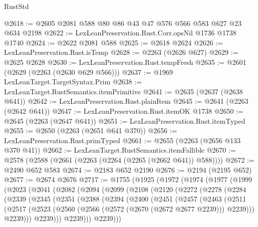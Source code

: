 \begin{lexlean}{RustStd}
\begin{coremodule}
@2618 := @2605 @2081 @588 @80 @86 @43 @47 @576 @566 @583 @627 @23 @634 @2198
@2622 := LexLeanPreservation.Rust.Corr.opsNil @1736 @1738 @1740
@2624 := @2622 @2081 @588
@2625 := @2618 @2624
@2626 := LexLeanPreservation.Rust.isTemp
@2628 := @2263 (@2626 @627)
@2629 := @2625 @2628
@2630 := LexLeanPreservation.Rust.tempFresh
@2635 := @2601 (@2629 (@2263 (@2630 @629 @566)))
@2637 := @1969 LexLeanTarget.TargetSyntax.Prim
@2638 := LexLeanTarget.RustSemantics.itemPrimitive
@2641 := @2635 (@2637 (@2638 @641))
@2642 := LexLeanPreservation.Rust.plainItem
@2645 := @2641 (@2263 (@2642 @641))
@2647 := LexLeanPreservation.Rust.itemOK @1738
@2650 := @2645 (@2263 (@2647 @641))
@2651 := LexLeanPreservation.Rust.itemTyped
@2655 := @2650 (@2263 (@2651 @641 @370))
@2656 := LexLeanPreservation.Rust.primTyped
@2661 := @2655 (@2263 (@2656 @133 @370 @41))
@2662 := LexLeanTarget.RustSemantics.itemFallible
@2670 := @2578 (@2588 (@2661 (@2263 (@2264 (@2265 (@2662 @641)) @588))))
@2672 := @2490 @652 @583
@2674 := @2183 @652 @2190
@2676 := @2194 (@2195 @652)
@2677 := @2674 @2676
@2717 := @1755
    (@1925
      (@1972
        (@1974
          (@1977
            (@1999
              (@2023
                (@2041
                  (@2082
                    (@2094
                      (@2099
                        (@2108
                          (@2120
                            (@2272
                              (@2278
                                (@2284
                                  (@2339
                                    (@2345
                                      (@2351
                                        (@2388
                                          (@2394
                                            (@2400
                                              (@2451
                                                (@2457
                                                  (@2463
                                                    (@2511
                                                      (@2517
                                                        (@2523
                                                          (@2560
                                                            (@2566
                                                              (@2572 (@2670 (@2672 @2677 @2239)))
                                                              @2239)))
                                                        @2239)))
                                                  @2239)))
                                            @2239)))
                                      @2239)))

\end{coremodule}
\end{lexlean}
